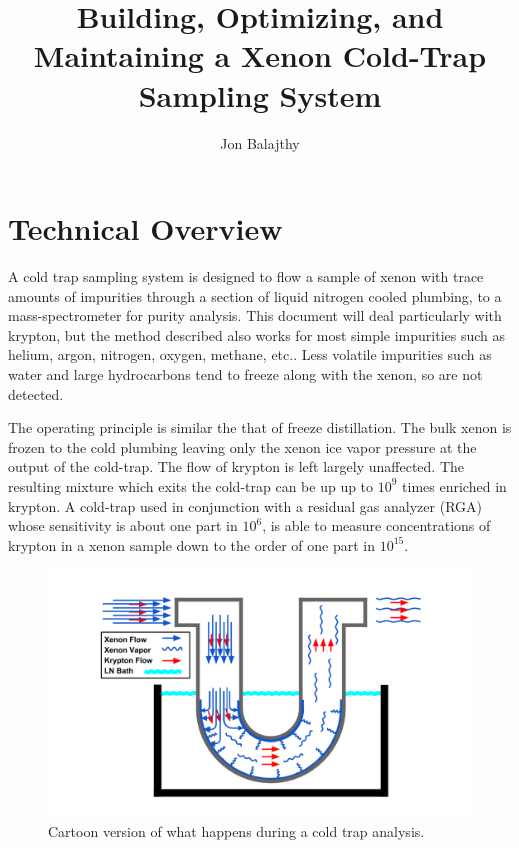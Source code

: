 \documentclass[12pt]{article}
\title{Building, Optimizing, and Maintaining a Xenon Cold-Trap Sampling System}
\author
{Jon Balajthy}
\date{}
\begin{document}
 

\baselineskip24pt


\maketitle 



\section{Technical Overview}
A cold trap sampling system is designed to flow a sample of xenon with trace amounts of impurities through a section of liquid nitrogen cooled plumbing, to a mass-spectrometer for purity analysis. This document will deal particularly with krypton, but the method described also works for most simple impurities  such as helium, argon, nitrogen, oxygen, methane, etc.. Less volatile impurities such as water and large hydrocarbons tend to freeze along with the xenon, so are not detected. 

The operating principle is similar the that of freeze distillation. The bulk xenon is frozen to the cold plumbing leaving only the xenon ice vapor pressure at the output of the cold-trap. The flow of krypton is left largely unaffected. The resulting mixture which exits the cold-trap can be up up to $10^9$ times enriched in krypton. A cold-trap used in conjunction with a residual gas analyzer (RGA) whose sensitivity is about one part in $10^6$, is able to measure concentrations of krypton in a xenon sample down to the order of one part in $10^{15}$.
\begin{figure}[h]
  \includegraphics[width=\linewidth]{Figures/Cold_Trap_cartoon.png}
  \caption{Cartoon version of what happens during a cold trap analysis. }
  \label{fig:CTcartoon}
\end{figure}
\end{document}
